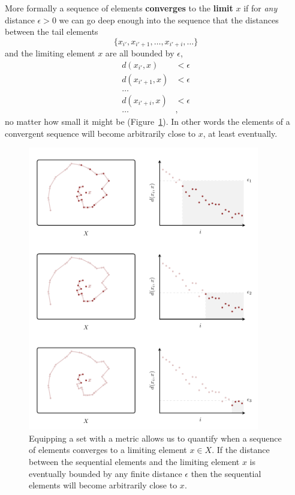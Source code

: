 \documentclass[
  letterpaper,
  DIV=11,
  numbers=noendperiod]{scrartcl}
\begin{document}
More formally a sequence of elements \textbf{converges} to the
\textbf{limit} \(x\) if for \emph{any} distance \(\epsilon > 0\) we can
go deep enough into the sequence that the distances between the tail
elements \[
\{ x_{i'}, x_{i' + 1}, \ldots, x_{i' + i}, \ldots \}
\] and the limiting element \(x\) are all bounded by \(\epsilon\),
\begin{align*}
d(x_{i'}, x) &< \epsilon
\\
d(x_{i' + 1}, x) &< \epsilon
\\
\ldots&
\\
d(x_{i' + i}, x) &< \epsilon
\\
\ldots&,
\end{align*} no matter how small it might be
(Figure~\ref{fig-metric-convergence}). In other words the elements of a
convergent sequence will become arbitrarily close to \(x\), at least
eventually.

\begin{figure}

{\centering \includegraphics[width=0.9\textwidth,height=\textheight]{figures/structures/metric_convergence/metric_convergence.pdf}

}

\caption{\label{fig-metric-convergence}Equipping a set with a metric
allows us to quantify when a sequence of elements converges to a
limiting element \(x \in X\). If the distance between the sequential
elements and the limiting element \(x\) is eventually bounded by any
finite distance \(\epsilon\) then the sequential elements will become
arbitrarily close to \(x\).}

\end{figure}
\end{document}
